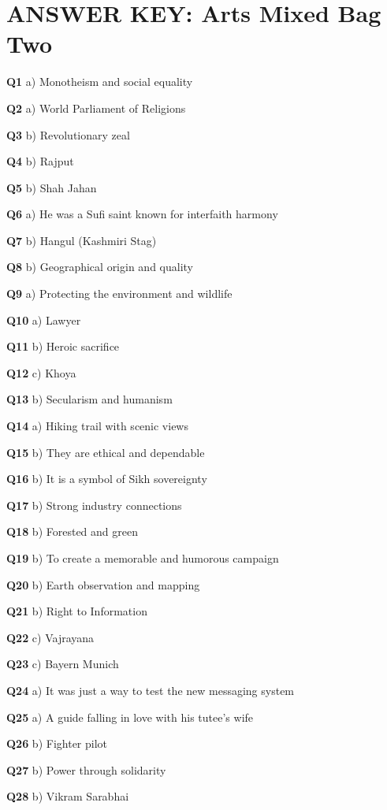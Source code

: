 \section{ANSWER KEY: Arts Mixed Bag Two}

\textbf{Q1} a) Monotheism and social equality\par
\textbf{Q2} a) World Parliament of Religions\par
\textbf{Q3} b) Revolutionary zeal\par
\textbf{Q4} b) Rajput\par
\textbf{Q5} b) Shah Jahan\par
\textbf{Q6} a) He was a Sufi saint known for interfaith harmony\par
\textbf{Q7} b) Hangul (Kashmiri Stag)\par
\textbf{Q8} b) Geographical origin and quality\par
\textbf{Q9} a) Protecting the environment and wildlife\par
\textbf{Q10} a) Lawyer\par
\textbf{Q11} b) Heroic sacrifice\par
\textbf{Q12} c) Khoya\par
\textbf{Q13} b) Secularism and humanism\par
\textbf{Q14} a) Hiking trail with scenic views\par
\textbf{Q15} b) They are ethical and dependable\par
\textbf{Q16} b) It is a symbol of Sikh sovereignty\par
\textbf{Q17} b) Strong industry connections\par
\textbf{Q18} b) Forested and green\par
\textbf{Q19} b) To create a memorable and humorous campaign\par
\textbf{Q20} b) Earth observation and mapping\par
\textbf{Q21} b) Right to Information\par
\textbf{Q22} c) Vajrayana\par
\textbf{Q23} c) Bayern Munich\par
\textbf{Q24} a) It was just a way to test the new messaging system\par
\textbf{Q25} a) A guide falling in love with his tutee's wife\par
\textbf{Q26} b) Fighter pilot\par
\textbf{Q27} b) Power through solidarity\par
\textbf{Q28} b) Vikram Sarabhai\par
